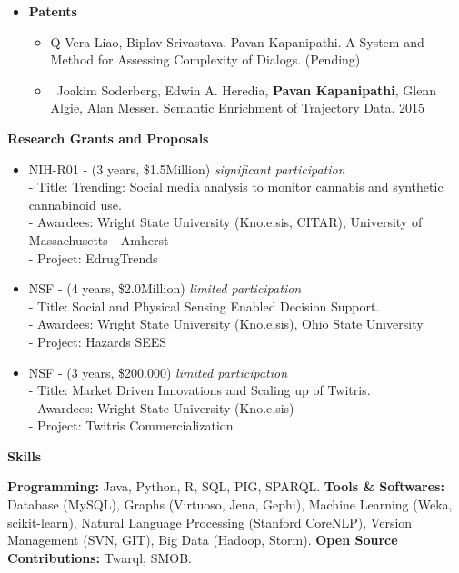 \documentclass[letterpaper,9pt]{article}
\newcommand{\resheading}[1]{{\large \colorbox{mygrey}{\begin{minipage}{\textwidth}{\textbf{#1 \vphantom{p\^{E}}}}\end{minipage}}}}
\begin{document}
\begin{itemize}
\begin{itemize}
\end{itemize}
\item \textbf{Patents}
\begin{itemize}
\item Q Vera Liao, Biplav Srivastava, Pavan Kapanipathi. A System and Method for Assessing Complexity of Dialogs. (Pending) 
\item\ Joakim Soderberg, Edwin A. Heredia, \textbf{Pavan Kapanipathi}, Glenn Algie,  Alan Messer. Semantic Enrichment of Trajectory Data. 2015
\end{itemize}
\end{itemize}


\resheading{Research Grants and Proposals}
\begin{itemize}
\item NIH-R01 - (3 years, \$1.5Million) \textit{significant participation}\\
- Title: Trending: Social media analysis to monitor cannabis and synthetic cannabinoid use.\\
- Awardees: Wright State University (Kno.e.sis, CITAR), University of Massachusetts - Amherst \\
- Project: EdrugTrends
\item NSF - (4 years, \$2.0Million) \textit{limited participation}\\
- Title: Social and Physical Sensing Enabled Decision Support.\\
- Awardees: Wright State University (Kno.e.sis), Ohio State University \\
- Project: Hazards SEES
\item NSF - (3 years, \$200.000) \textit{limited participation}\\
- Title: Market Driven Innovations and Scaling up of Twitris.\\
- Awardees: Wright State University (Kno.e.sis) \\
- Project: Twitris Commercialization
\end{itemize}

\resheading{Skills}
\vspace{0.05in}

\textbf{Programming:} Java, Python, R, SQL, PIG, SPARQL.\linebreak
\textbf{Tools \& Softwares:} Database (MySQL), Graphs (Virtuoso, Jena, Gephi), Machine Learning (Weka, scikit-learn), Natural Language Processing (Stanford CoreNLP), Version Management (SVN, GIT), Big Data (Hadoop, Storm).\linebreak
\textbf{Open Source Contributions:} Twarql, SMOB.\linebreak 
\end{document}
